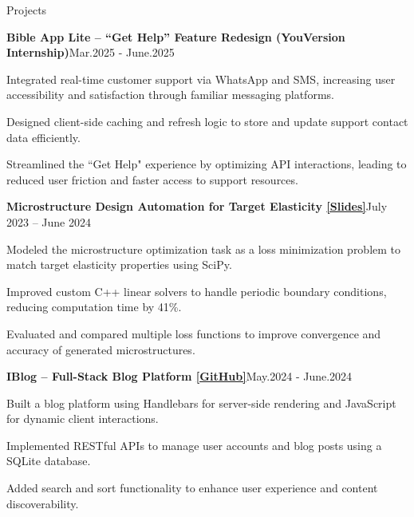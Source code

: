 \documentclass{resume} %
\begin{document}
	\begin{rSection}{Projects}

        \begin{rSubsection}{\bf Bible App Lite – “Get Help” Feature Redesign (YouVersion Internship)}{Mar.2025 - June.2025}{}{}
             \item {Integrated real-time customer support via WhatsApp and SMS, increasing user accessibility and satisfaction through familiar messaging platforms.}
             \item {Designed client-side caching and refresh logic to store and update support contact data efficiently.}
             \item {Streamlined the ``Get Help" experience by optimizing API interactions, leading to reduced user friction and faster access to support resources.}
        \end{rSubsection}

        \begin{rSubsection}{\bf Microstructure Design Automation for Target Elasticity \href{https://docs.google.com/presentation/d/1vE1fTo60TzdEpiMjofUK8VLwj55keTxsokcQTI54zJE/edit?usp=sharing}{[Slides]}}{July 2023 -- June 2024}{}{}
            \item{Modeled the microstructure optimization task as a loss minimization problem to match target elasticity properties using SciPy.}
            \item{Improved custom C++ linear solvers to handle periodic boundary conditions, reducing computation time by 41\%.}
            \item{Evaluated and compared multiple loss functions to improve convergence and accuracy of generated microstructures.}
        \end{rSubsection}

        \begin{rSubsection}{\bf IBlog – Full-Stack Blog Platform \href{https://github.com/JaekeeAI/ecs162finalproject}{[GitHub]}}{May.2024 - June.2024}{}{}
             \item{Built a blog platform using Handlebars for server-side rendering and JavaScript for dynamic client interactions.}
             \item{Implemented RESTful APIs to manage user accounts and blog posts using a SQLite database.}
             \item{Added search and sort functionality to enhance user experience and content discoverability.}
        \end{rSubsection}
            

\end{rSection}
\end{document}
